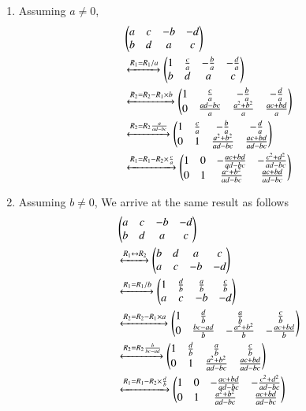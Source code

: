 \begin{enumerate}
    \item Assuming $a \neq 0$, 
    \begin{align}
        &\begin{pmatrix}a & c & -b & -d \\ b & d & a & c\end{pmatrix}  \nonumber \\
        &\xleftrightarrow{R_1 = R_1/a} \begin{pmatrix}1 & \frac{c}{a} & -\frac{b}{a} & -\frac{d}{a} \\ b & d & a & c\end{pmatrix} \nonumber \\
&\xleftrightarrow{R_2 = R_2 - R_1\times b} \begin{pmatrix}1 & \frac{c}{a} & -\frac{b}{a} & -\frac{d}{a} \\ 0 & \frac{ad-bc}{a} & \frac{a^2+b^2}{a} & \frac{ac+bd}{a}\end{pmatrix} \nonumber \\
&\xleftrightarrow{R_2 = R_2\frac{a}{ad-bc}} \begin{pmatrix}1 & \frac{c}{a} & -\frac{b}{a} & -\frac{d}{a} \\ 0 & 1 & \frac{a^2+b^2}{ad-bc} & \frac{ac+bd}{ad-bc}\end{pmatrix} \nonumber \\
&\xleftrightarrow{R_1 = R_1 - R_2\times\frac{c}{a}} \begin{pmatrix}1 & 0 & -\frac{ac+bd}{ad-bc} & -\frac{c^2+d^2}{ad-bc} \\ 0 & 1 & \frac{a^2+b^2}{ad-bc} & \frac{ac+bd}{ad-bc}\end{pmatrix} \nonumber
    \end{align}
\item Assuming $b \neq 0$, We arrive at the same result as follows
\begin{align}
    &\begin{pmatrix}a & c & -b & -d \\ b & d & a & c\end{pmatrix} \nonumber \\ 
    &\xleftrightarrow{R_1\leftrightarrow R_2} \begin{pmatrix} b & d & a & c \\ a & c & -b & -d \end{pmatrix} \nonumber \\
&\xleftrightarrow{R_1 = R_1/b}   \begin{pmatrix} 1 & \frac{d}{b} & \frac{a}{b} & \frac{c}{b} \\ a & c & -b & -d \end{pmatrix} \nonumber \\
&\xleftrightarrow{R_2 = R_2 - R_1\times a} \begin{pmatrix} 1 & \frac{d}{b} & \frac{a}{b} & \frac{c}{b} \\ 0 & \frac{bc-ad}{b} & -\frac{a^2+b^2}{b} & -\frac{ac+bd}{b}\end{pmatrix} \nonumber \\
&\xleftrightarrow{R_2 = R_2\frac{b}{bc-ad}} \begin{pmatrix} 1 & \frac{d}{b} & \frac{a}{b} & \frac{c}{b} \\ 0 & 1 & \frac{a^2+b^2}{ad-bc} & \frac{ac+bd}{ad-bc}\end{pmatrix} \nonumber \\
&\xleftrightarrow{R_1 = R_1 - R_2\times\frac{d}{b}} \begin{pmatrix}1 & 0 & -\frac{ac+bd}{ad-bc} & -\frac{c^2+d^2}{ad-bc} \\ 0 & 1 & \frac{a^2+b^2}{ad-bc} & \frac{ac+bd}{ad-bc}\end{pmatrix} \nonumber
\end{align}
\end{enumerate}
